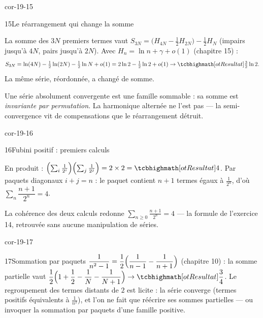 \begin{blocLivre}{cor-19-15}
\begin{corrige}{15}{Le réarrangement qui change la somme}
\begin{questions}
  \item La somme des $3N$ premiers termes vaut
    $S_{3N}=\bigl(H_{4N}-\tfrac12H_{2N}\bigr)-\tfrac12H_{N}$ (impairs
    jusqu'à $4N$, pairs jusqu'à $2N$). Avec
    $H_n=\ln n+\gamma+o(1)$ (chapitre 15) :
    \[
    S_{3N}=\ln(4N)-\tfrac12\ln(2N)-\tfrac12\ln N+o(1)
    =2\ln2-\tfrac12\ln2+o(1)\to\res{\tfrac32\ln2} .
    \]
    La même série, réordonnée, a changé de somme.
  \item Une série absolument convergente est une famille sommable : sa
    somme est \emph{invariante par permutation}. La harmonique alternée
    ne l'est pas — la semi-convergence vit de compensations que le
    réarrangement détruit.
\end{questions}
\end{corrige}
\end{blocLivre}

\begin{blocLivre}{cor-19-16}
\begin{corrige}{16}{Fubini positif : premiers calculs}
\begin{questions}
  \item En produit :
    $\Bigl(\sum_i\frac{1}{2^{i}}\Bigr)\Bigl(\sum_j\frac{1}{2^{j}}\Bigr)
    =2\times2=\res{4}$. Par paquets diagonaux $i+j=n$ : le paquet
    contient $n+1$ termes égaux à $\frac{1}{2^{n}}$, d'où
    $\sum_n\dfrac{n+1}{2^{n}}=4$.
  \item La cohérence des deux calculs redonne
    $\displaystyle\sum_{n\geqslant0}\frac{n+1}{2^{n}}=4$ — la formule de
    l'exercice 14, retrouvée sans aucune manipulation de séries.
\end{questions}
\end{corrige}
\end{blocLivre}

\begin{blocLivre}{cor-19-17}
\begin{corrige}{17}{Sommation par paquets}
$\dfrac{1}{n^{2}-1}=\dfrac12\Bigl(\dfrac{1}{n-1}-\dfrac{1}{n+1}\Bigr)$
(chapitre 10) : la somme partielle vaut
$\dfrac12\Bigl(1+\dfrac12-\dfrac1N-\dfrac{1}{N+1}\Bigr)\to\res{\dfrac34}$.
Le regroupement des termes distants de $2$ est licite : la série
converge (termes positifs équivalents à $\frac{1}{n^{2}}$), et l'on ne
fait que réécrire ses sommes partielles — ou invoquer la sommation par
paquets d'une famille positive.
\end{corrige}
\end{blocLivre}

